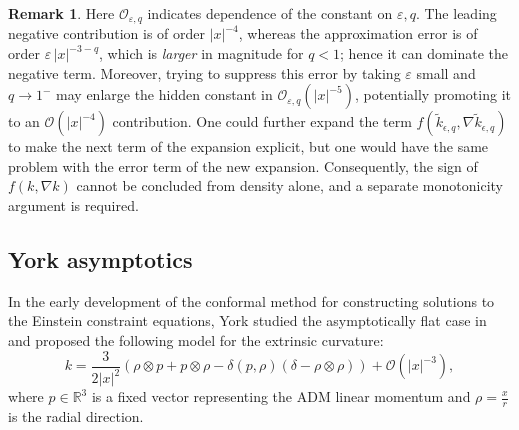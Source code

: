 \documentclass[12pt,a4paper]{amsart}
\theoremstyle{plain}
\theoremstyle{definition}
\newtheorem{remark}[theorem]{Remark}
\begin{document}
\begin{remark}
Here \(\mathcal O_{\varepsilon,q}\) indicates dependence of the constant on \(\varepsilon,q\). The leading negative contribution is of order \(|x|^{-4}\), whereas the approximation error is of order \(\varepsilon\,|x|^{-3-q}\), which is \emph{larger} in magnitude for \(q<1\); hence it can dominate the negative term. Moreover, trying to suppress this error by taking \(\varepsilon\) small and \(q\to1^{-}\) may enlarge the hidden constant in \(\mathcal O_{\varepsilon,q}(|x|^{-5})\), potentially promoting it to an \(\mathcal O(|x|^{-4})\) contribution. One could further expand the term   $f(\tilde{k}_{\epsilon,q},\nabla \tilde{k}_{\epsilon,q})$ to make the next term of the expansion explicit, but one would have the same problem with the error term of the new expansion. Consequently, the sign of \(f(k,\nabla k)\) cannot be concluded from density alone, and a separate monotonicity argument is required.
\end{remark}
\subsection*{York asymptotics}
In the early development of the conformal method for constructing solutions to the Einstein constraint equations, York studied the asymptotically flat case in \cite{york1979kinematics} and proposed the following model for the extrinsic curvature:
\[
k = \frac{3}{2|x|^2} \left( \rho \otimes p + p \otimes \rho - \delta( p, \rho ) (\delta - \rho \otimes \rho) \right) + \mathcal{O}(|x|^{-3}),
\]
where \( p \in \mathbb{R}^3 \) is a fixed vector representing the ADM linear momentum and \( \rho = \frac{x}{r} \) is the radial direction.
\end{document}
